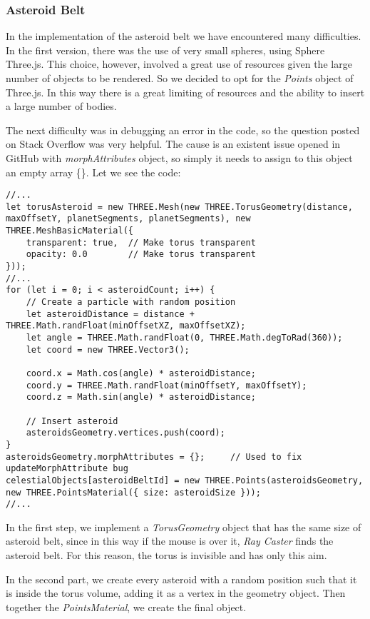 \documentclass{article}
\begin{document}
\subsubsection{Asteroid Belt}
In the implementation of the asteroid belt we have encountered many difficulties.\\
In the first version, there was the use of very small spheres, using Sphere Three.js. This choice, however, involved a great use of resources given the large number of objects to be rendered. So we decided to opt for the \textit{Points}\cite{documentation:threejs} object of Three.js. In this way there is a great limiting of resources and the ability to insert a large number of bodies. 
\par The next difficulty was in debugging an error in the code, so the question posted on Stack Overflow was very helpful\cite{asteroids:stackoverflow}. The cause is an existent issue opened in GitHub with \textit{morphAttributes} object, so simply it needs to assign to this object an empty array \{\}. Let we see the code:
\begin{lstlisting}
//...
let torusAsteroid = new THREE.Mesh(new THREE.TorusGeometry(distance, maxOffsetY, planetSegments, planetSegments), new THREE.MeshBasicMaterial({
	transparent: true,  // Make torus transparent
	opacity: 0.0        // Make torus transparent
}));
//...
for (let i = 0; i < asteroidCount; i++) {
	// Create a particle with random position
	let asteroidDistance = distance + THREE.Math.randFloat(minOffsetXZ, maxOffsetXZ);
	let angle = THREE.Math.randFloat(0, THREE.Math.degToRad(360));
	let coord = new THREE.Vector3();
	
	coord.x = Math.cos(angle) * asteroidDistance;
	coord.y = THREE.Math.randFloat(minOffsetY, maxOffsetY);
	coord.z = Math.sin(angle) * asteroidDistance;

	// Insert asteroid
	asteroidsGeometry.vertices.push(coord);
}
asteroidsGeometry.morphAttributes = {};     // Used to fix updateMorphAttribute bug
celestialObjects[asteroidBeltId] = new THREE.Points(asteroidsGeometry, new THREE.PointsMaterial({ size: asteroidSize }));
//...
\end{lstlisting}
In the first step, we implement a \textit{TorusGeometry}\cite{documentation:threejs} object that has the same size of asteroid belt, since in this way if the mouse is over it, \textit{Ray Caster} finds the asteroid belt. For this reason, the torus is invisible and has only this aim.
\par In the second part, we create every asteroid with a random position such that it is inside the torus volume, adding it as a vertex in the geometry object. Then together the \textit{PointsMaterial}\cite{documentation:threejs}, we create the final object.
\end{document}
